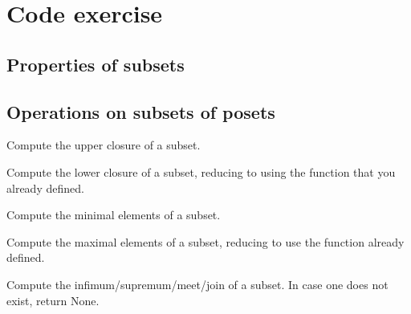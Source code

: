 \section{Code exercise}

\subsection{Properties of subsets}

\subsection{Operations on subsets of posets}

\begin{codeexercise}
    Compute the upper closure of a subset.

\end{codeexercise}

\begin{codeexercise}
    Compute the lower closure of a subset, reducing to using the function  that you already defined.

\end{codeexercise}

\begin{codeexercise}
    Compute the minimal elements of a subset.


\end{codeexercise}

\begin{codeexercise}
    Compute the maximal elements of a subset, reducing to use the function  already defined.


\end{codeexercise}

\begin{codeexercise}
    Compute the infimum/supremum/meet/join of a subset.
    In case one does not exist, return None.


\end{codeexercise}

